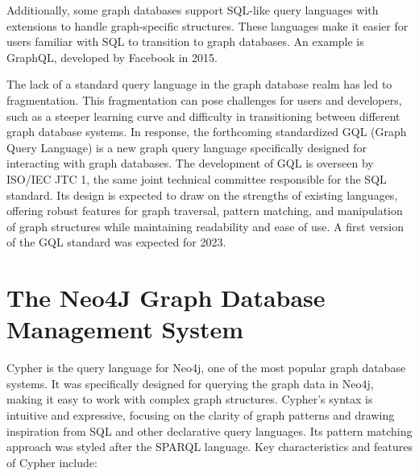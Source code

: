 Additionally, some graph databases support SQL-like query languages with extensions to handle graph-specific structures. These languages make it easier for users familiar with SQL to transition to graph databases. An example is GraphQL, developed by Facebook in 2015. 

The lack of a standard query language in the graph database realm has led to fragmentation. This fragmentation can pose challenges for users and developers, such as a steeper learning curve and difficulty in transitioning between different graph database systems. In response, the forthcoming standardized GQL (Graph Query Language) is a new graph query language specifically designed for interacting with graph databases. The development of GQL is overseen by ISO/IEC JTC 1, the same joint technical committee responsible for the SQL standard. Its design is expected to draw on the strengths of existing languages, offering robust features for graph traversal, pattern matching, and manipulation of graph structures while maintaining readability and ease of use. A first version of the GQL standard was expected for 2023.

\section{The Neo4J Graph Database Management System}

Cypher is the query language for Neo4j, one of the most popular graph database systems. It was specifically designed for querying the graph data in Neo4j, making it easy to work with complex graph structures. Cypher's syntax is intuitive and expressive, focusing on the clarity of graph patterns and drawing inspiration from SQL and other declarative query languages. Its pattern matching approach was styled after the SPARQL language. Key characteristics and features of Cypher include:


